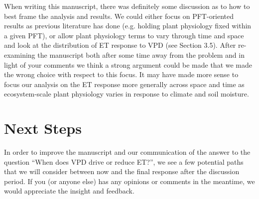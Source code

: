 When writing this manuscript, there was definitely some discussion as to how to best frame the analysis and results. We
could either focus on PFT-oriented results as previous literature has
done (e.g. holding plant physiology fixed within a given PFT), or
allow plant physiology terms to vary through time and space and look
at the distribution of ET response to VPD (see Section 3.5). After
re-examining the manuscript both after some time away from the
problem and in light of your comments we think a strong argument could
be made that we made the wrong choice with respect to this focus. It
may have made more sense to focus our analysis on the ET response more
generally across space and time as ecosystem-scale plant physiology
varies in response to climate and soil moisture.

\section{Next Steps}

In order to improve the manuscript and our communication of the answer to
the question ``When does VPD drive or reduce ET?'', we see a few
potential paths that we will consider between now and the final
response after the discussion period. If you (or anyone else) has any
opinions or comments in the meantime, we would appreciate the insight
and feedback.

